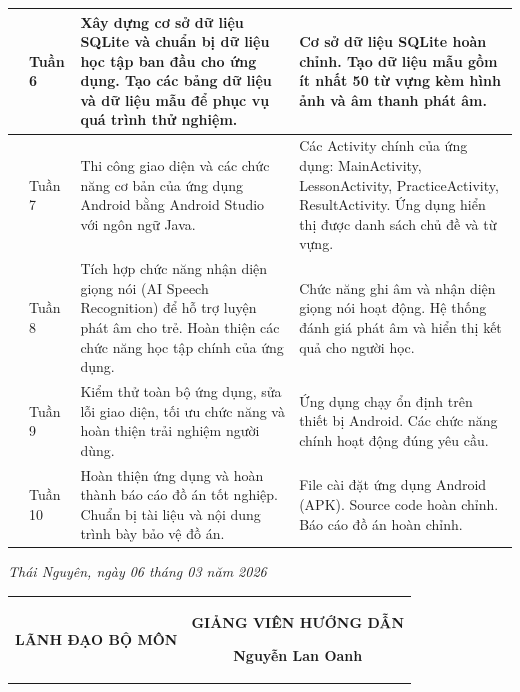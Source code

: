 \documentclass[../main.tex]{subfiles}
\begin{document}
\begin{center}
\begin{longtable}{|>{\centering\arraybackslash}p{0.8cm}|
				>{\centering\arraybackslash}p{1.45cm}|
				>{\raggedright\arraybackslash}p{6.1cm}|
				>{\raggedright\arraybackslash}p{6.1cm}|}
			6 & Tuần 6 & Xây dựng cơ sở dữ liệu SQLite và chuẩn bị dữ liệu học tập ban đầu cho ứng dụng. Tạo các bảng dữ liệu và dữ liệu mẫu để phục vụ quá trình thử nghiệm. & Cơ sở dữ liệu SQLite hoàn chỉnh. Tạo dữ liệu mẫu gồm ít nhất 50 từ vựng kèm hình ảnh và âm thanh phát âm.\\ \hline
			7 & Tuần 7 & Thi công giao diện và các chức năng cơ bản của ứng dụng Android bằng Android Studio với ngôn ngữ Java. & Các Activity chính của ứng dụng: MainActivity, LessonActivity, PracticeActivity, ResultActivity. Ứng dụng hiển thị được danh sách chủ đề và từ vựng.\\ \hline
			8 & Tuần 8 & Tích hợp chức năng nhận diện giọng nói (AI Speech Recognition) để hỗ trợ luyện phát âm cho trẻ. Hoàn thiện các chức năng học tập chính của ứng dụng. & Chức năng ghi âm và nhận diện giọng nói hoạt động. Hệ thống đánh giá phát âm và hiển thị kết quả cho người học.\\ \hline
			9 & Tuần 9 & Kiểm thử toàn bộ ứng dụng, sửa lỗi giao diện, tối ưu chức năng và hoàn thiện trải nghiệm người dùng. & Ứng dụng chạy ổn định trên thiết bị Android. Các chức năng chính hoạt động đúng yêu cầu.\\ \hline
			10 & Tuần 10 & Hoàn thiện ứng dụng và hoàn thành báo cáo đồ án tốt nghiệp. Chuẩn bị tài liệu và nội dung trình bày bảo vệ đồ án. & File cài đặt ứng dụng Android (APK). Source code hoàn chỉnh. Báo cáo đồ án hoàn chỉnh.\\ \hline
		\end{longtable}
		\normalsize
	\end{center}
	
	\vspace{0.7cm}
	
	\begin{flushright}
		\textit{Thái Nguyên, ngày 06 tháng 03 năm 2026}
	\end{flushright}
	
	\vspace{0.4cm}
	
	\noindent
	\begin{tabular*}{\textwidth}{@{\extracolsep{\fill}}cc}
		\begin{minipage}{0.42\textwidth}
			\centering
			\textbf{LÃNH ĐẠO BỘ MÔN}
			
			\vspace{2.5cm}
		\end{minipage}
		&
		\begin{minipage}{0.42\textwidth}
			\centering
			\textbf{GIẢNG VIÊN HƯỚNG DẪN}
			
			\vspace{2.2cm}
			
			\textbf{Nguyễn Lan Oanh}
		\end{minipage}
	\end{tabular*}
	
\end{document}
